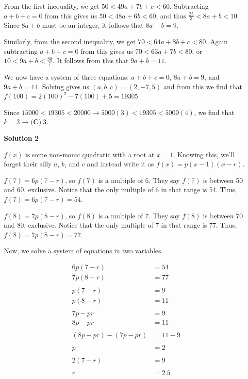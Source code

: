 \begin{enumerate}
 From the first inequality, we get $50 < 49a+7b+c < 60$. Subtracting $a+b+c = 0$ from this gives us $50 < 48a+6b < 60$, and thus $\frac{25}{3} < 8a+b < 10$. Since $8a+b$ must be an integer, it follows that $8a+b = 9$.

 Similarly, from the second inequality, we get $70 < 64a+8b+c < 80$. Again subtracting $a+b+c = 0$ from this gives us $70 < 63a+7b < 80$, or $10 < 9a+b < \frac{80}{7}$. It follows from this that $9a+b = 11$.

 We now have a system of three equations: $a+b+c = 0$, $8a+b = 9$, and $9a+b = 11$. Solving gives us $(a, b, c) = (2, -7, 5)$ and from this we find that $f(100) = 2(100)^2-7(100)+5 = 19305$

 Since $15000 < 19305 < 20000 \to 5000(3) < 19305 < 5000(4)$, we find that $k = 3 \rightarrow \boxed{\textbf{(C)}\ 3}$.

 



\textbf{Solution 2}

$f(x)$ is some non-monic quadratic with a root at $x=1$. Knowing this, we'll forget their silly $a$, $b$, and $c$ and instead write it as $f(x)=p(x-1)(x-r)$.

 $f(7)=6p(7-r)$, so $f(7)$ is a multiple of 6. They say $f(7)$ is between 50 and 60, exclusive. Notice that the only multiple of 6 in that range is 54. Thus, $f(7)=6p(7-r)=54$.

 $f(8)=7p(8-r)$, so $f(8)$ is a multiple of 7. They say $f(8)$ is between 70 and 80, exclusive. Notice that the only multiple of 7 in that range is 77. Thus, $f(8)=7p(8-r)=77$.

 Now, we solve a system of equations in two variables. 

 
 \begin{align*} 6p(7-r)&=54 \\ 7p(8-r)&=77 \\ \\ p(7-r)&=9 \\ p(8-r)&=11 \\ \\ 7p-pr&=9 \\ 8p-pr&=11 \\ \\ (8p-pr)-(7p-pr)&=11-9 \\ \\ p&=2 \\ \\ 2(7-r)&=9 \\ \\ r&=2.5 \end{align*}


\end{enumerate}

